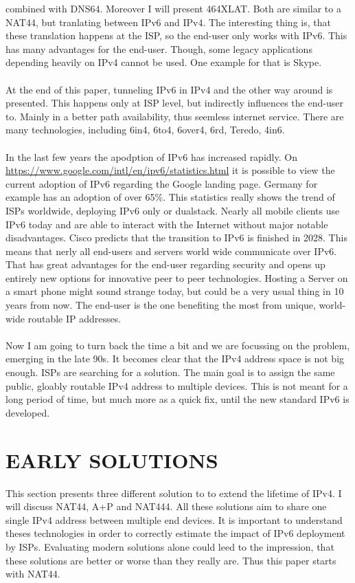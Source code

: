 \documentclass[format=sigconf, natbib=true, nonacm=true]{acmart}
\begin{document}
combined with DNS64. Moreover I will present 464XLAT. Both are similar to a NAT44, but tranlating between IPv6 and IPv4. The interesting thing is, that these translation happens at the ISP, so the end-user only works with IPv6. This has many advantages for the end-user. Though, some legacy applications depending heavily on IPv4 cannot be used. One example for that is Skype.\\\\At the end of this paper, tunneling IPv6 in IPv4 and the other way around is presented. This happens only at ISP level, but indirectly influences the end-user to. Mainly in a better path availability, thus seemless internet service. There are many technologies, including 6in4, 6to4, 6over4, 6rd, Teredo, 4in6.\\\\In the last few years the apodption of IPv6 has increased rapidly. On \url{https://www.google.com/intl/en/ipv6/statistics.html} it is possible to view the current adoption of IPv6 regarding the Google landing page. Germany for example has an adoption of over 65\%. This statistics really shows the trend of ISPs worldwide, deploying IPv6 only or dualstack. Nearly all mobile clients use IPv6 today and are able to interact with the Internet without major notable disadvantages. Cisco predicts that the transition to IPv6 is finished in 2028. This means that nerly all end-users and servers world wide communicate over IPv6. That has great advantages for the end-user regarding security and opens up entirely new options for innovative peer to peer technologies. Hosting a Server on a smart phone might sound strange today, but could be a very usual thing in 10 years from now. The end-user is the one benefiting the most from unique, world-wide routable IP addresses.\\\\Now I am going to turn back the time a bit and we are focussing on the problem, emerging in the late 90s. It becomes clear that the IPv4 address space is not big enough. ISPs are searching for a solution. The main goal is to assign the same public, gloably routable IPv4 address to multiple devices. This is not meant for a long period of time, but much more as a quick fix, until the new standard IPv6 is developed.
    
    \section{EARLY SOLUTIONS}
    This section presents three different solution to to extend the lifetime of IPv4. I will discuss NAT44, A+P and NAT444. All these solutions aim to share one single IPv4 address between multiple end devices. It is important to understand theses technologies in order to correctly estimate the impact of IPv6 deployment by ISPs. Evaluating modern solutions alone could leed to the impression, that these solutions are better or worse than they really are. Thus this paper starts with NAT44.
\end{document}
